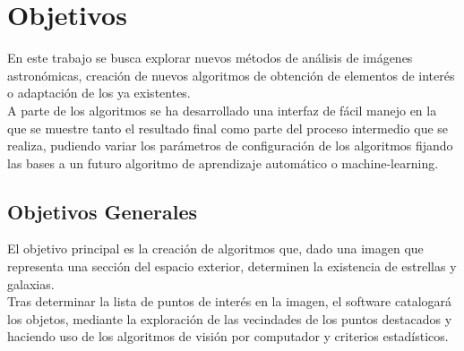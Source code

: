 	\newpage 

	\section{Objetivos}
	\label{sec:objetivos}
	En este trabajo se busca explorar nuevos métodos de análisis de imágenes astronómicas, creación de nuevos algoritmos de obtención de elementos de interés o adaptación de los ya existentes.\\
	A parte de los algoritmos se ha desarrollado una interfaz de fácil manejo en la que se muestre tanto el resultado final como parte del proceso intermedio que se realiza, pudiendo variar los parámetros de configuración de los algoritmos fijando las bases a un futuro algoritmo de aprendizaje automático o machine-learning.
	
	\subsection{Objetivos Generales}
	
	El objetivo principal es la creación de algoritmos que, dado una imagen que representa una sección del espacio exterior, determinen la existencia de estrellas y galaxias.
	\\
	Tras determinar la lista de puntos de interés en la imagen, el software catalogará los objetos, mediante la exploración de las vecindades de los puntos destacados y haciendo uso de los algoritmos de visión por computador y criterios estadísticos.
	
